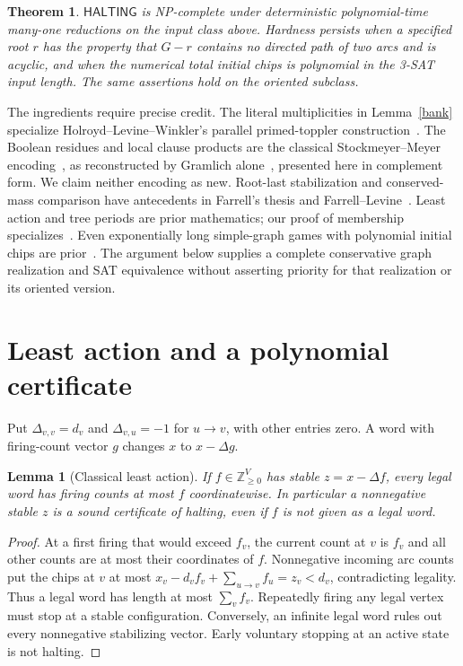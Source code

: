 \documentclass[11pt]{article}
\newtheorem{theorem}{Theorem}
\newtheorem{lemma}{Lemma}
\newcommand{\Z}{\mathbb Z}
\newcommand{\HALT}{\mathsf{HALTING}}
\begin{document}
\begin{theorem}\label{main}
$\HALT$ is NP-complete under deterministic polynomial-time many-one
reductions on the input class above. Hardness persists when a specified root
$r$ has the property that $G-r$ contains no directed path of two arcs and is
acyclic, and when the numerical total initial chips is polynomial in the
3-SAT input length. The same assertions hold on the oriented subclass.
\end{theorem}

The ingredients require precise credit. The literal multiplicities in
Lemma~\ref{bank} specialize Holroyd--Levine--Winkler's parallel primed-toppler
construction~\cite[Lemma~4.1]{HLW}. The Boolean residues and local clause
products are the classical Stockmeyer--Meyer encoding~\cite[Theorem~6.1]{SM},
as reconstructed by Gramlich alone~\cite[Fact~3]{Gramlich}, presented here in
complement form. We claim neither encoding as new. Root-last stabilization
and conserved-mass comparison have antecedents in Farrell's thesis
\cite[\S\S1.1,4.1]{Farrell} and Farrell--Levine~\cite[\S2]{FL}.
Least action and tree periods are prior mathematics; our proof of membership
specializes~\cite[\S3]{FL}. Even exponentially long simple-graph games with
polynomial initial chips are prior~\cite{Eriksson}. The argument below supplies
a complete conservative graph realization and SAT equivalence without
asserting priority for that realization or its oriented version.

\section{Least action and a polynomial certificate}
Put $\Delta_{v,v}=d_v$ and $\Delta_{v,u}=-1$ for $u\to v$, with other entries
zero. A word with firing-count vector $g$ changes $x$ to $x-\Delta g$.

\begin{lemma}[Classical least action]\label{least}
If $f\in\Z_{\ge0}^{V}$ has stable $z=x-\Delta f$, every legal word has
firing counts at most $f$ coordinatewise. In particular a nonnegative stable
$z$ is a sound certificate of halting, even if $f$ is not given as a legal word.
\end{lemma}
\begin{proof}
At a first firing that would exceed $f_v$, the current count at $v$ is $f_v$
and all other counts are at most their coordinates of $f$. Nonnegative
incoming arc counts put the chips at $v$ at most
$x_v-d_vf_v+\sum_{u\to v}f_u=z_v<d_v$, contradicting legality.
Thus a legal word has length at most $\sum_v f_v$. Repeatedly firing any legal
vertex must stop at a stable configuration. Conversely, an infinite legal
word rules out every nonnegative stabilizing vector. Early voluntary stopping
at an active state is not halting.
\end{proof}
\end{document}
